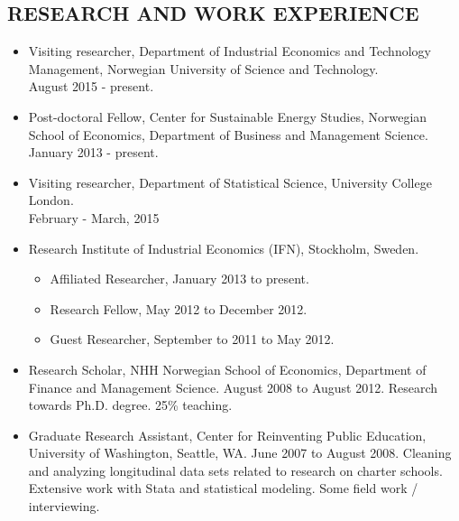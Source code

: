 \documentclass[margin]{res}
\begin{document}
\begin{resume}
 
\section{RESEARCH AND WORK EXPERIENCE}      
                  \begin{itemize}
                  \setlength{\itemsep}{10pt}
                  \item[] Visiting researcher, Department of Industrial Economics and Technology Management, Norwegian University of Science and Technology. \\ August 2015 - present. 
                  \item[] Post-doctoral Fellow, Center for Sustainable Energy Studies, Norwegian School of Economics, Department of Business and Management Science. \\ January 2013 - present.

                  \item[] Visiting researcher, Department of Statistical Science, University College London. \\ February - March, 2015
                  
                  \item[] Research Institute of Industrial Economics (IFN), Stockholm, Sweden.
                    \begin{itemize} 
                    \item[] Affiliated Researcher, January 2013 to present.
                    \item[] Research Fellow, May 2012 to December 2012.
                    \item[] Guest Researcher, September to 2011 to May 2012.
                    \end{itemize}
                  \item[] Research Scholar, NHH Norwegian School of Economics, Department of Finance and Management Science. August 2008 to August 2012.  
                  Research towards Ph.D. degree.  25\% teaching.
                  
                  \item[] Graduate Research Assistant, Center for Reinventing Public Education, University of Washington, Seattle, WA. June 2007 to August 2008.  
                  Cleaning and analyzing longitudinal data sets related to research on charter schools.  Extensive work with Stata and statistical modeling.  Some field work / interviewing.
                  

\end{itemize}
\end{resume}
\end{document}
